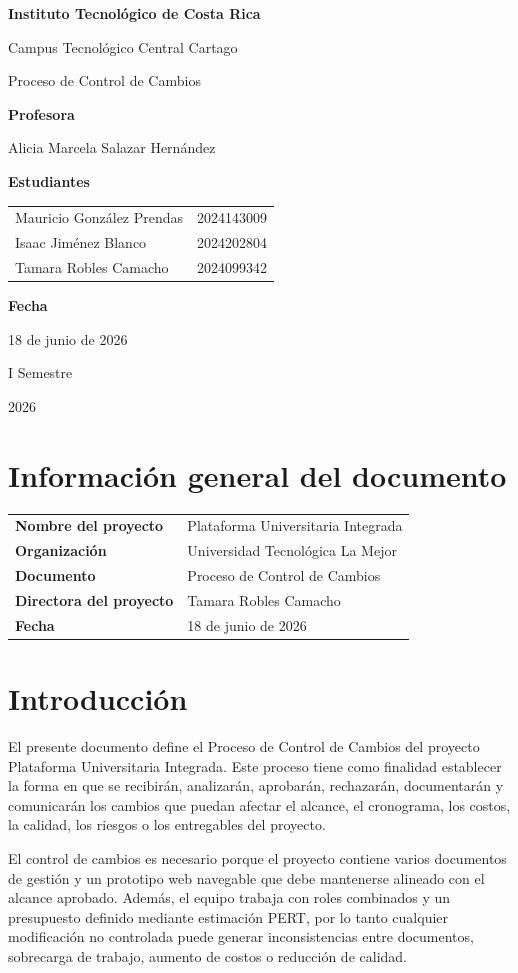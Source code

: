 \documentclass[11pt,spanish]{article}
\title{\DocumentoTitulo}
\author{\AutoresPortada}
\date{\FechaDocumento}
\makeatletter
\newcommand{\Institucion}{Instituto Tecnológico de Costa Rica}
\newcommand{\Campus}{Campus Tecnológico Central Cartago}
\newcommand{\DocumentoTitulo}{Proceso de Control de Cambios}
\newcommand{\Profesor}{Alicia Marcela Salazar Hernández}
\newcommand{\FechaDocumento}{18 de junio de 2026}
\newcommand{\PeriodoAcademico}{I Semestre}
\newcommand{\AnioDocumento}{2026}
\newcommand{\AutoresPortada}{%
    \begin{tabular}{l@{\hspace{1.5cm}}r}
        Mauricio González Prendas & 2024143009 \\
        Isaac Jiménez Blanco & 2024202804 \\
        Tamara Robles Camacho & 2024099342 \\
    \end{tabular}%
}
\newcommand{\MakeCover}{%
\begin{titlepage}
\thispagestyle{empty}
\centering

{\bfseries \huge \Institucion \par}
\vspace{0.25cm}
{\LARGE \Campus \par}

\vfill

{\huge \DocumentoTitulo \par}

\vfill

{\bfseries \LARGE Profesora \par}
{\Large \Profesor \par}

\vfill

{\bfseries \LARGE Estudiantes \par}
{\Large \AutoresPortada \par}

\vfill

{\bfseries\LARGE Fecha \par}
{\Large \FechaDocumento \par}

\vfill

{\LARGE \PeriodoAcademico \par}
{\LARGE \AnioDocumento \par}

\end{titlepage}%
}
\makeatother
\begin{document}
\hypersetup{pageanchor=false}

\MakeCover

\pagestyle{empty}
\tableofcontents
\clearpage
{}
\hypersetup{pageanchor=true}
\pagestyle{fancy}


\section{Información general del documento}

\begin{table}[H]
\centering
\begin{tabularx}{\textwidth}{p{5cm} Y}
\toprule
\textbf{Nombre del proyecto} & Plataforma Universitaria Integrada \\
\textbf{Organización} & Universidad Tecnológica La Mejor \\
\textbf{Documento} & \DocumentoTitulo \\
\textbf{Directora del proyecto} & Tamara Robles Camacho \\
\textbf{Fecha} & \FechaDocumento \\
\bottomrule
\end{tabularx}
\end{table}

\section{Introducción}

El presente documento define el Proceso de Control de Cambios del proyecto Plataforma Universitaria Integrada. Este proceso tiene como finalidad establecer la forma en que se recibirán, analizarán, aprobarán, rechazarán, documentarán y comunicarán los cambios que puedan afectar el alcance, el cronograma, los costos, la calidad, los riesgos o los entregables del proyecto.

El control de cambios es necesario porque el proyecto contiene varios documentos de gestión y un prototipo web navegable que debe mantenerse alineado con el alcance aprobado. Además, el equipo trabaja con roles combinados y un presupuesto definido mediante estimación PERT, por lo tanto cualquier modificación no controlada puede generar inconsistencias entre documentos, sobrecarga de trabajo, aumento de costos o reducción de calidad.
\end{document}
